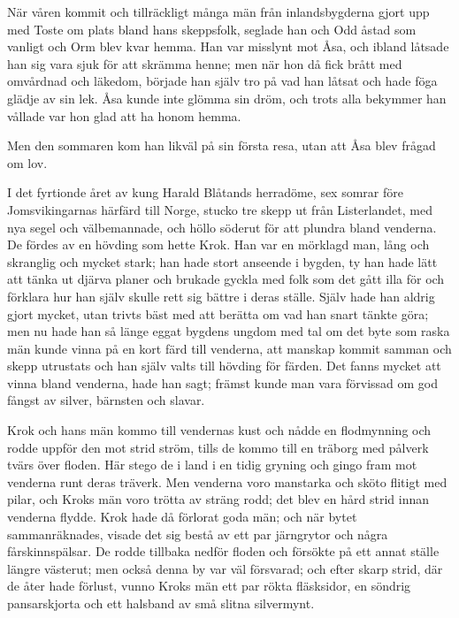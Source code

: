 \initial När våren kommit och tillräckligt många män från inlandsbygderna gjort upp med Toste om plats bland hans skeppsfolk, seglade han och Odd åstad som vanligt och Orm blev kvar hemma. Han var misslynt mot Åsa, och ibland låtsade han sig vara sjuk för att skrämma henne; men när hon då fick brått med omvårdnad och läkedom, började han själv tro på vad han låtsat och hade föga glädje av sin lek. Åsa kunde inte glömma sin dröm, och trots alla bekymmer han vållade var hon glad att ha honom hemma.

\initial Men den sommaren kom han likväl på sin första resa, utan att Åsa blev frågad om lov.

%
%


\initial I det fyrtionde året av kung Harald Blåtands herradöme, sex somrar före Jomsvikingarnas härfärd till Norge, stucko tre skepp ut från Listerlandet, med nya segel och välbemannade, och höllo söderut för att plundra bland venderna. De fördes av en hövding som hette Krok. Han var en mörklagd man, lång och skranglig och mycket stark; han hade stort anseende i bygden, ty han hade lätt att tänka ut djärva planer och brukade gyckla med folk som det gått illa för och förklara hur han själv skulle rett sig bättre i deras ställe. Själv hade han aldrig gjort mycket, utan trivts bäst med att berätta om vad han snart tänkte göra; men nu hade han så länge eggat bygdens ungdom med tal om det byte som raska män kunde vinna på en kort färd till venderna, att manskap kommit samman och skepp utrustats och han själv valts till hövding för färden. Det fanns mycket att vinna bland venderna, hade han sagt; främst kunde man vara förvissad om god fångst av silver, bärnsten och slavar.

\initial Krok och hans män kommo till vendernas kust och nådde en flodmynning och rodde uppför den mot strid ström, tills de kommo till en träborg med pålverk tvärs över floden. Här stego de i land i en tidig gryning och gingo fram mot venderna runt deras träverk. Men venderna voro manstarka och sköto flitigt med pilar, och Kroks män voro trötta av sträng rodd; det blev en hård strid innan venderna flydde. Krok hade då förlorat goda män; och när bytet sammanräknades, visade det sig bestå av ett par järngrytor och några fårskinnspälsar. De rodde tillbaka nedför floden och försökte på ett annat ställe längre västerut; men också denna by var väl försvarad; och efter skarp strid, där de åter hade förlust, vunno Kroks män ett par rökta fläsksidor, en söndrig pansarskjorta och ett halsband av små slitna silvermynt.

